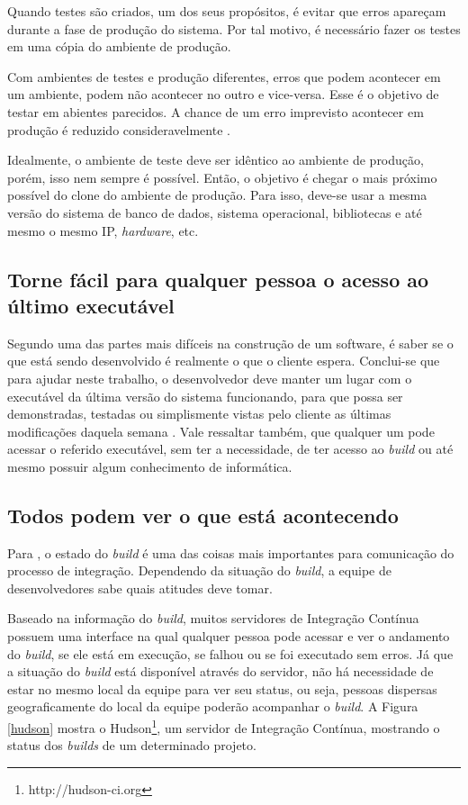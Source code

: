 Quando testes são criados, um dos seus propósitos, é evitar que erros apareçam durante a fase de produção do sistema. Por tal motivo, é necessário fazer os testes em uma cópia do ambiente de produção.

Com ambientes de testes e produção diferentes, erros que podem acontecer em um ambiente, podem não acontecer no outro e vice-versa. Esse é o objetivo de testar em abientes parecidos. A chance de um erro imprevisto acontecer em produção é reduzido consideravelmente \cite{FOWLER}.

Idealmente, o ambiente de teste deve ser idêntico ao ambiente de produção, porém, isso nem sempre é possível. Então, o objetivo é chegar o mais próximo possível do clone do ambiente de produção. Para isso, deve-se usar a mesma versão do sistema de banco de dados, sistema operacional, bibliotecas e até mesmo o mesmo IP, \textit{hardware}, etc.

\subsection{Torne fácil para qualquer pessoa o acesso ao último executável}

Segundo  uma das partes mais difíceis na construção de um software, é saber se o que está sendo desenvolvido é realmente o que o cliente espera. Conclui-se que para ajudar neste trabalho, o desenvolvedor deve manter um lugar com o executável da última versão do sistema funcionando, para que possa ser demonstradas, testadas ou simplismente vistas pelo cliente as últimas modificações daquela semana \cite{FOWLER}. Vale ressaltar também, que qualquer um pode acessar o referido executável, sem ter a necessidade, de ter acesso ao \textit{build} ou até mesmo possuir algum conhecimento de informática.

\subsection{Todos podem ver o que está acontecendo}

Para , o estado do \textit{build} é uma das coisas mais importantes para comunicação do processo de integração. Dependendo da situação do \textit{build}, a equipe de desenvolvedores sabe quais atitudes deve tomar.

Baseado na informação do \textit{build}, muitos servidores de Integração Contínua possuem uma interface na qual qualquer pessoa pode acessar e ver o andamento do \textit{build}, se ele está em execução, se falhou ou se foi executado sem erros. Já que a situação do \textit{build} está disponível através do servidor, não há necessidade de estar no mesmo local da equipe para ver seu status, ou seja, pessoas dispersas geograficamente do local da equipe poderão acompanhar o \textit{build}. A Figura \ref{hudson} mostra o Hudson\footnote{http://hudson-ci.org}, um servidor de Integração Contínua, mostrando o status dos \textit{builds} de um determinado projeto.

